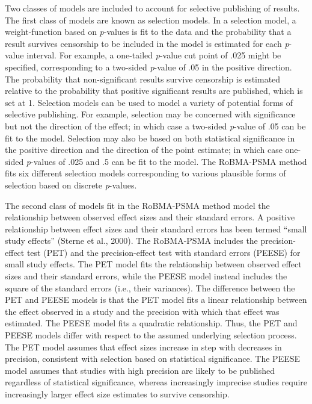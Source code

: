 \documentclass[
  doc, donotrepeattitle,floatsintext]{apa7}
\begin{document}
Two classes of models are included to account for selective publishing of results. The first class of models are known as selection models. In a selection model, a weight-function based on \emph{p}-values is fit to the data and the probability that a result survives censorship to be included in the model is estimated for each \emph{p}-value interval. For example, a one-tailed \emph{p}-value cut point of .025 might be specified, corresponding to a two-sided \emph{p}-value of .05 in the positive direction. The probability that non-significant results survive censorship is estimated relative to the probability that positive significant results are published, which is set at 1. Selection models can be used to model a variety of potential forms of selective publishing. For example, selection may be concerned with significance but not the direction of the effect; in which case a two-sided \emph{p}-value of .05 can be fit to the model. Selection may also be based on both statistical significance in the positive direction and the direction of the point estimate; in which case one-sided \emph{p}-values of .025 and .5 can be fit to the model. The RoBMA-PSMA method fits six different selection models corresponding to various plausible forms of selection based on discrete \emph{p}-values.

The second class of models fit in the RoBMA-PSMA method model the relationship between observed effect sizes and their standard errors. A positive relationship between effect sizes and their standard errors has been termed ``small study effects'' (Sterne et al., 2000). The RoBMA-PSMA includes the precision-effect test (PET) and the precision-effect test with standard errors (PEESE) for small study effects. The PET model fits the relationship between observed effect sizes and their standard errors, while the PEESE model instead includes the square of the standard errors (i.e., their variances). The difference between the PET and PEESE models is that the PET model fits a linear relationship between the effect observed in a study and the precision with which that effect was estimated. The PEESE model fits a quadratic relationship. Thus, the PET and PEESE models differ with respect to the assumed underlying selection process. The PET model assumes that effect sizes increase in step with decreases in precision, consistent with selection based on statistical significance. The PEESE model assumes that studies with high precision are likely to be published regardless of statistical significance, whereas increasingly imprecise studies require increasingly larger effect size estimates to survive censorship.
\end{document}
